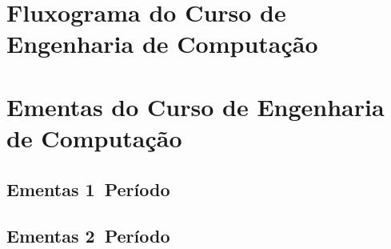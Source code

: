 
\fancyhead[L]{}
\pagestyle{fancy}
\chapter{Fluxograma do Curso de Engenharia de Computação}
\label{fluxograma}
\begin{landscape}
    
\end{landscape}
\chapter{Ementas do Curso de Engenharia de Computação}
\label{ementas}
\section{Ementas 1\textordmasculine~Período}
\pagebreak




\section{Ementas 2\textordmasculine~Período}
\pagebreak






